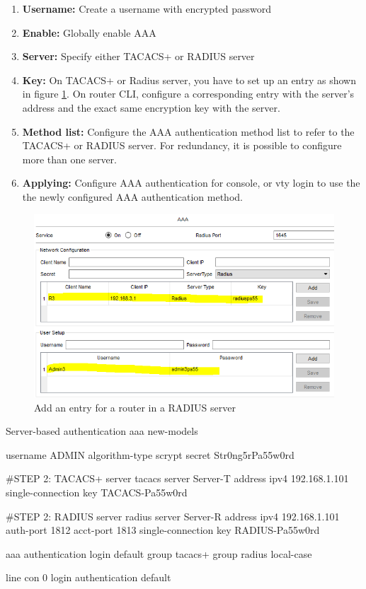 \begin{enumerate}
\item \textbf{Username:} Create a username with encrypted password
\item \textbf{Enable:} Globally enable AAA
\item \textbf{Server:} Specify either TACACS+ or RADIUS server
\item \textbf{Key:} On TACACS+ or  Radius  server, you have to set up an entry as shown in figure \ref{RADIUSserver}. On router CLI, configure a corresponding entry with the server's address and the exact same encryption key with the server.
\item \textbf{Method list:} Configure the AAA authentication method list to refer to the TACACS+ or RADIUS server. For redundancy, it is possible to configure more than one server.
\item \textbf{Applying:} Configure AAA authentication for console, or vty login to use the the newly configured AAA authentication method.
\end{enumerate}

\begin{figure}[hbtp]
\caption{Add an entry for a router in a RADIUS server}\label{RADIUSserver}
\centering
\includegraphics[scale=0.5]{pictures/RADIUSserver.PNG}
\end{figure}


\begin{sexylisting}{Server-based authentication}
aaa new-models

username ADMIN algorithm-type scrypt secret Str0ng5rPa55w0rd

#STEP 2: TACACS+ server
tacacs server Server-T
  address ipv4 192.168.1.101
  single-connection
  key TACACS-Pa55w0rd

#STEP 2: RADIUS server 
radius server Server-R
  address ipv4 192.168.1.101 auth-port 1812 acct-port 1813
  single-connection
  key RADIUS-Pa55w0rd

aaa authentication login default group tacacs+ group radius local-case

line con 0
login authentication default 
\end{sexylisting}

